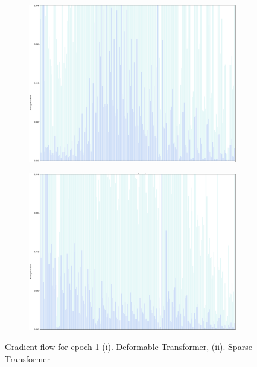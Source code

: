 \begin{figure}[h]
	\centering
	\begin{subfigure}[b]{0.55\textwidth}
		\includegraphics[width=\linewidth]{assets/img/deformable_grad_flow_epoch_1.png}
	\end{subfigure}%
	\begin{subfigure}[b]{0.55\textwidth}
		\includegraphics[width=\linewidth]{assets/img/sparse_grad_flow_epoch_1.png}
	\end{subfigure}
	\caption{Gradient flow for epoch 1 (i). Deformable Transformer, (ii). Sparse Transformer}
	
	\label{fig:gradientflowepoch1}
\end{figure}

